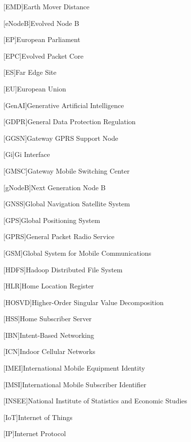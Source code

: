 \begin{acronym}[]
[EMD]{Earth Mover Distance}

[eNodeB]{Evolved Node B}

[EP]{European Parliament}

[EPC]{Evolved Packet Core}

[ES]{Far Edge Site}

[EU]{European Union}

[GenAI]{Generative Artificial Intelligence}

[GDPR]{General Data Protection Regulation}

[GGSN]{Gateway GPRS Support Node}

[Gi]{Gi Interface}


[GMSC]{Gateway Mobile Switching Center}

[gNodeB]{Next Generation Node B}  

[GNSS]{Global Navigation Satellite System}

[GPS]{Global Positioning System}

[GPRS]{General Packet Radio Service}

[GSM]{Global System for Mobile Communications}

[HDFS]{Hadoop Distributed File System}

[HLR]{Home Location Register}

[HOSVD]{Higher-Order Singular Value Decomposition}

[HSS]{Home Subscriber Server}

[IBN]{Intent-Based Networking}

[ICN]{Indoor Cellular Networks}

[IMEI]{International Mobile Equipment Identity}

[IMSI]{International Mobile Subscriber Identifier}

[INSEE]{National Institute of Statistics and Economic Studies}

[IoT]{Internet of Things}

[IP]{Internet Protocol}


\end{acronym}
